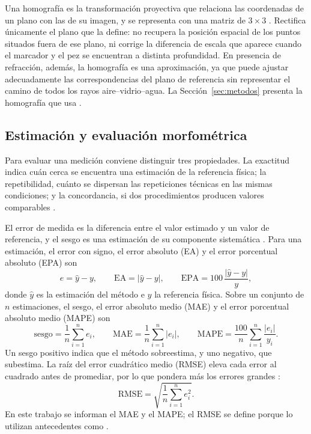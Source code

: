 Una homografía es la transformación proyectiva que relaciona las coordenadas de un plano con las de su imagen, y se representa con una matriz de $3 \times 3$ \parencite{Hartley2004}. Rectifica únicamente el plano que la define: no recupera la posición espacial de los puntos situados fuera de ese plano, ni corrige la diferencia de escala que aparece cuando el marcador y el pez se encuentran a distinta profundidad. En presencia de refracción, además, la homografía es una aproximación, ya que puede ajustar adecuadamente las correspondencias del plano de referencia sin representar el camino de todos los rayos aire--vidrio--agua. La Sección~\ref{sec:metodos} presenta la homografía que usa \Aprime.

\subsection{Estimación y evaluación morfométrica}
\label{sec:metricas}

Para evaluar una medición conviene distinguir tres propiedades. La exactitud indica cuán cerca se encuentra una estimación de la referencia física; la repetibilidad, cuánto se dispersan las repeticiones técnicas en las mismas condiciones; y la concordancia, si dos procedimientos producen valores comparables \parencite{Bland1986}.

El error de medida es la diferencia entre el valor estimado y un valor de referencia, y el sesgo es una estimación de su componente sistemática \parencite{JCGM2012}. Para una estimación, el error con signo, el error absoluto (EA) y el error porcentual absoluto (EPA) son
\begin{equation}
e = \hat{y} - y, \qquad \mathrm{EA} = \lvert \hat{y} - y \rvert, \qquad \mathrm{EPA} = 100\,\frac{\lvert \hat{y} - y \rvert}{y},
\label{eq:errores}
\end{equation}
donde $\hat{y}$ es la estimación del método e $y$ la referencia física. Sobre un conjunto de $n$ estimaciones, el sesgo, el error absoluto medio (MAE) y el error porcentual absoluto medio (MAPE) son \parencite{Willmott2005,Hyndman2006}
\begin{equation}
\mathrm{sesgo} = \frac{1}{n}\sum_{i=1}^{n} e_i, \qquad
\mathrm{MAE} = \frac{1}{n}\sum_{i=1}^{n} \lvert e_i \rvert, \qquad
\mathrm{MAPE} = \frac{100}{n}\sum_{i=1}^{n} \frac{\lvert e_i \rvert}{y_i}.
\label{eq:agregados}
\end{equation}
Un sesgo positivo indica que el método sobreestima, y uno negativo, que subestima. La raíz del error cuadrático medio (RMSE) eleva cada error al cuadrado antes de promediar, por lo que pondera más los errores grandes \parencite{Willmott2005,Chai2014}:
\begin{equation}
\mathrm{RMSE} = \sqrt{\frac{1}{n}\sum_{i=1}^{n} e_i^2}.
\label{eq:rmse}
\end{equation}
En este trabajo se informan el MAE y el MAPE; el RMSE se define porque lo utilizan antecedentes como \textcite{Seibold2026}.

